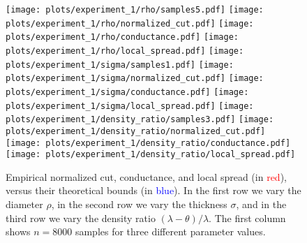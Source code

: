 \documentclass[twoside,11pt]{article}
\newcommand{\1}{\mathbf{1}}
\begin{document}
\begin{figure}[htb]
	\centering
	\texttt{[image: plots/experiment\_1/rho/samples5.pdf]}
	\texttt{[image: plots/experiment\_1/rho/normalized\_cut.pdf]}
	\texttt{[image: plots/experiment\_1/rho/conductance.pdf]}
	\texttt{[image: plots/experiment\_1/rho/local\_spread.pdf]}
	\texttt{[image: plots/experiment\_1/sigma/samples1.pdf]}
	\texttt{[image: plots/experiment\_1/sigma/normalized\_cut.pdf]}
	\texttt{[image: plots/experiment\_1/sigma/conductance.pdf]}
	\texttt{[image: plots/experiment\_1/sigma/local\_spread.pdf]}
	\texttt{[image: plots/experiment\_1/density\_ratio/samples3.pdf]}
	\texttt{[image: plots/experiment\_1/density\_ratio/normalized\_cut.pdf]}
	\texttt{[image: plots/experiment\_1/density\_ratio/conductance.pdf]}
	\texttt{[image: plots/experiment\_1/density\_ratio/local\_spread.pdf]}
	\caption{\small Empirical normalized cut, conductance, and local spread (in \textcolor{red}{red}), versus their theoretical bounds (in \textcolor{blue}{blue}). In the first row we vary the diameter $\rho$, in the second row we vary the thickness $\sigma$, and in the third row we vary the density ratio $(\lambda - \theta)/\lambda$. The first column shows $n = 8000$ samples for three different parameter values.}
	\label{fig:bounds}
\end{figure}
\end{document}
